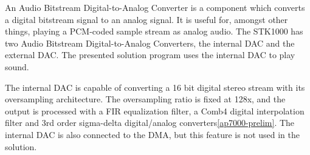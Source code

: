 An Audio Bitstream Digital-to-Analog Converter is a component which converts a digital bitstream signal to an analog signal.
It is useful for, amongst other things, playing a PCM-coded sample stream as analog audio.
The STK1000 has two Audio Bitstream Digital-to-Analog Converters, the internal DAC and the external DAC.
The presented solution program uses the internal DAC to play sound.

The internal DAC is capable of converting a 16 bit digital stereo stream with its oversampling architecture. The oversampling ratio is fixed at 128x, and the output is processed with a FIR equalization filter, a Comb4 digital interpolation filter and 3rd order sigma-delta digital/analog converters\ref{ap7000-prelim}.
The internal DAC is also connected to the DMA, but this feature is not used in the solution.
